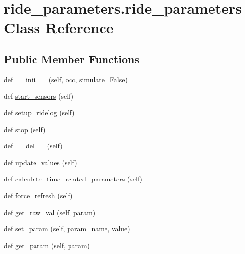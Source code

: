 \hypertarget{classride__parameters_1_1ride__parameters}{}\section{ride\+\_\+parameters.\+ride\+\_\+parameters Class Reference}
\label{classride__parameters_1_1ride__parameters}
\subsection*{Public Member Functions}
\begin{DoxyCompactItemize}
\item 
def \hyperlink{classride__parameters_1_1ride__parameters_a2b6d7ea51b7ceb4cda0370a00028e048}{\+\_\+\+\_\+init\+\_\+\+\_\+} (self, \hyperlink{classride__parameters_1_1ride__parameters_a76014d9517093d35d2660f8660544071}{occ}, simulate=False)
\item 
def \hyperlink{classride__parameters_1_1ride__parameters_afce46ab54897c7bfb53dfc41369ea710}{start\+\_\+sensors} (self)
\item 
def \hyperlink{classride__parameters_1_1ride__parameters_a28fd2385edb5031e2ed4ef601707f78b}{setup\+\_\+ridelog} (self)
\item 
def \hyperlink{classride__parameters_1_1ride__parameters_a38286161b1fed8db1a1eab4f72bc100d}{stop} (self)
\item 
def \hyperlink{classride__parameters_1_1ride__parameters_ac7565bcad12b1d5c16d14fa1dd93b600}{\+\_\+\+\_\+del\+\_\+\+\_\+} (self)
\item 
def \hyperlink{classride__parameters_1_1ride__parameters_a0298eab61d08a06ce19b02a7a2017261}{update\+\_\+values} (self)
\item 
def \hyperlink{classride__parameters_1_1ride__parameters_a5a52f0de392b339a4645f5a6b7f5c028}{calculate\+\_\+time\+\_\+related\+\_\+parameters} (self)
\item 
def \hyperlink{classride__parameters_1_1ride__parameters_abdbe40847a9540e6fbea1aa1c395f4c0}{force\+\_\+refresh} (self)
\item 
def \hyperlink{classride__parameters_1_1ride__parameters_aca8aefb88a0260ec04ea182a9331facd}{get\+\_\+raw\+\_\+val} (self, param)
\item 
def \hyperlink{classride__parameters_1_1ride__parameters_a9dc6e4ca486f38f6b26953427ef0586b}{set\+\_\+param} (self, param\+\_\+name, value)
\item 
def \hyperlink{classride__parameters_1_1ride__parameters_aeb3f33542ac30687ce80dac161fcd193}{get\+\_\+param} (self, param)

\end{DoxyCompactItemize}

